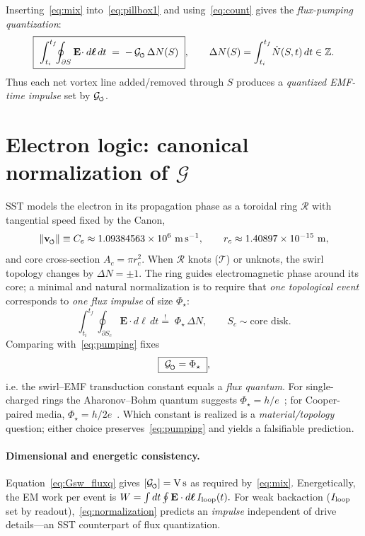 \documentclass[11pt,a4paper]{article}
\newcommand{\swirlarrow}{%
    \mathchoice{\mkern-2mu\scriptstyle\boldsymbol{\circlearrowleft}}%
    {\mkern-2mu\scriptstyle\boldsymbol{\circlearrowleft}}%
    {\mkern-2mu\scriptscriptstyle\boldsymbol{\circlearrowleft}}%
    {\mkern-2mu\scriptscriptstyle\boldsymbol{\circlearrowleft}}%
}
\begin{document}
Inserting~\eqref{eq:mix} into~\eqref{eq:pillbox1} and using~\eqref{eq:count} gives the \emph{flux-pumping quantization}:
\begin{equation}
\boxed{\ \int_{t_i}^{t_f}\!\!\oint_{\partial S}\mathbf E\!\cdot d\boldsymbol\ell\,dt
\;=\; -\,\mathcal G_{\rm \swirlarrow}\, \Delta N(S)\ },
\qquad \Delta N(S)=\int_{t_i}^{t_f}\!\dot N(S,t)\,dt \in \mathbb Z.
\label{eq:pumping}
\end{equation}
Thus each net vortex line added/removed through $S$ produces a \emph{quantized EMF-time impulse} set by $\mathcal G_{\rm \swirlarrow}$.

\section{Electron logic: canonical normalization of $\mathcal G$}
SST models the electron in its propagation phase as a toroidal ring $\mathcal R$ with tangential speed fixed by the Canon,
\begin{equation}
\|\mathbf v_{\swirlarrow}\| \equiv C_e \approx 1.09384563\times 10^6~{\rm m\,s^{-1}},
\qquad r_c \approx 1.40897\times 10^{-15}~{\rm m},
\label{eq:canonCe}
\end{equation}
and core cross-section $A_c=\pi r_c^2$. When $\mathcal R$ knots ($\mathcal T$) or unknots, the swirl topology changes by $\Delta N=\pm 1$. The ring guides electromagnetic phase around its core; a minimal and natural normalization is to require that \emph{one topological event} corresponds to \emph{one flux impulse} of size $\Phi_\star$:
\begin{equation}
\int_{t_i}^{t_f}\!\!\oint_{\partial S_c}\mathbf E\!\cdot d\boldsymbol\ell\,dt
\stackrel{!}{=}\; \Phi_\star \,\Delta N,
\qquad S_c \sim \text{core disk}.
\label{eq:normalization}
\end{equation}
Comparing with~\eqref{eq:pumping} fixes
\begin{equation}
\boxed{\ \mathcal G_{\rm \swirlarrow} = \Phi_\star \ },
\label{eq:Gsw_fluxq}
\end{equation}
i.e. the swirl--EMF transduction constant equals a \emph{flux quantum}. For single-charged rings the Aharonov--Bohm quantum suggests $\Phi_\star=h/e$~\cite{Aharonov1959}; for Cooper-paired media, $\Phi_\star=h/2e$~\cite{Tinkham2004}. Which constant is realized is a \emph{material/topology} question; either choice preserves~\eqref{eq:pumping} and yields a falsifiable prediction.

\paragraph{Dimensional and energetic consistency.}
    Equation~\eqref{eq:Gsw_fluxq} gives $[\mathcal G_{\rm \swirlarrow}]={\rm V\,s}$ as required by~\eqref{eq:mix}. Energetically, the EM work per event is
    \(
    W=\int dt\oint \mathbf E\cdot d\boldsymbol\ell\,I_{\rm loop}(t).
    \)
    For weak backaction ($I_{\rm loop}$ set by readout),~\eqref{eq:normalization} predicts an \emph{impulse} independent of drive details—an SST counterpart of flux quantization.
\end{document}
